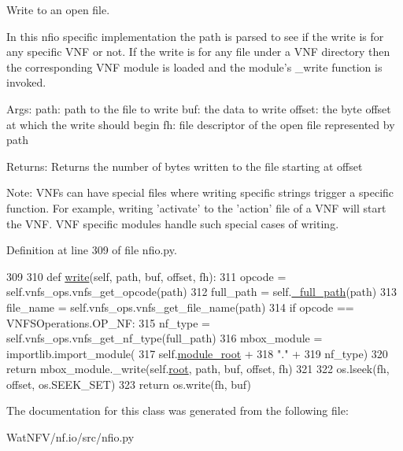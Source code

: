 Write to an open file. 

In this nfio specific implementation the path is parsed to see if the write is for any specific V\-N\-F or not. If the write is for any file under a V\-N\-F directory then the corresponding V\-N\-F module is loaded and the module's \-\_\-write function is invoked.

Args\-: path\-: path to the file to write buf\-: the data to write offset\-: the byte offset at which the write should begin fh\-: file descriptor of the open file represented by path

Returns\-: Returns the number of bytes written to the file starting at offset

Note\-: V\-N\-Fs can have special files where writing specific strings trigger a specific function. For example, writing 'activate' to the 'action' file of a V\-N\-F will start the V\-N\-F. V\-N\-F specific modules handle such special cases of writing. 

Definition at line 309 of file nfio.\-py.


\begin{DoxyCode}
309 
310     \textcolor{keyword}{def }\hyperlink{classnfio_1_1Nfio_a05cc0184ab93ef65958275c46e322137}{write}(self, path, buf, offset, fh):
311         opcode = self.vnfs\_ops.vnfs\_get\_opcode(path)
312         full\_path = self.\hyperlink{classnfio_1_1Nfio_ab4c25ee90129e28ddc7c88ad113869de}{\_full\_path}(path)
313         file\_name = self.vnfs\_ops.vnfs\_get\_file\_name(path)
314         \textcolor{keywordflow}{if} opcode == VNFSOperations.OP\_NF:
315             nf\_type = self.vnfs\_ops.vnfs\_get\_nf\_type(full\_path)
316             mbox\_module = importlib.import\_module(
317                 self.\hyperlink{classnfio_1_1Nfio_a7f13fbcef42434fff50bbe6f3f301e83}{module\_root} +
318                 \textcolor{stringliteral}{"."} +
319                 nf\_type)
320             \textcolor{keywordflow}{return} mbox\_module.\_write(self.\hyperlink{classnfio_1_1Nfio_aaebb8f6c5190c41a25e5415c56a5e6dd}{root}, path, buf, offset, fh)
321 
322         os.lseek(fh, offset, os.SEEK\_SET)
323         \textcolor{keywordflow}{return} os.write(fh, buf)

\end{DoxyCode}


The documentation for this class was generated from the following file\-:\begin{DoxyCompactItemize}
\item 
Wat\-N\-F\-V/nf.\-io/src/nfio.\-py\end{DoxyCompactItemize}

